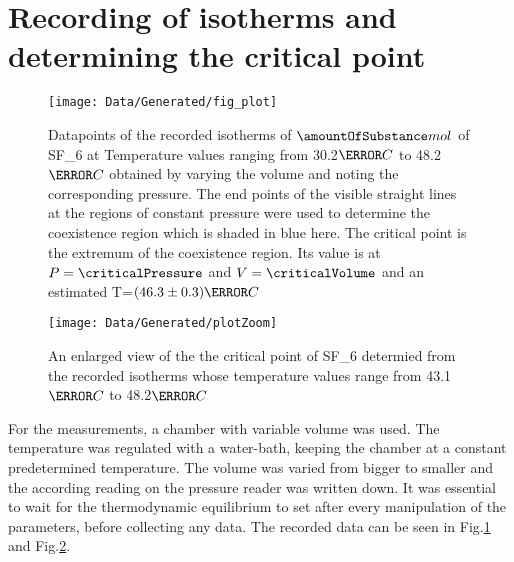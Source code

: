 \documentclass[a4paper,10pt,twocolumn]{article}
\begin{document}
    \section{Recording of isotherms and determining the critical point}
    \label{sec:Measurement}
    \begin{figure}
        \begin{center}
            \texttt{[image: Data/Generated/fig\_plot]}
            \caption[]{Datapoints of the recorded isotherms of $\amountOfSubstance mol$ of SF_6\) at Temperature values ranging from 30.2$\degree C$ to 48.2$\degree C$ obtained by varying the volume and noting the corresponding pressure. The end points of the visible straight lines at the regions of constant pressure were
            used to determine the coexistence region which is shaded in blue here. The critical point is the extremum of the coexistence region. Its value is at $P=\criticalPressure$ and $V=\criticalVolume$ and an estimated
            T=$(46.3\pm0.3)\degree C$}
            \label{binodal}
        \end{center}
    \end{figure}
    \begin{figure}
        \begin{center}
            \texttt{[image: Data/Generated/plotZoom]}
            \caption[]{An enlarged view of the the critical point of SF_6\) determied from the recorded isotherms whose temperature values range from 43.1$\degree C$ to 48.2$\degree C$}
            \label{ZoomedIn}
        \end{center}
    \end{figure}
    For the measurements, a chamber with variable volume was used.
    The temperature was regulated with a water-bath, keeping the chamber at a constant predetermined temperature.
    The volume was varied from bigger to smaller and the according reading on the pressure reader was written down.
    It was essential to wait for the thermodynamic equilibrium to set after every manipulation of the parameters, before collecting any data.
    The recorded data can be seen in Fig.\ref{binodal} and Fig.\ref{ZoomedIn}.
    
\end{document}
